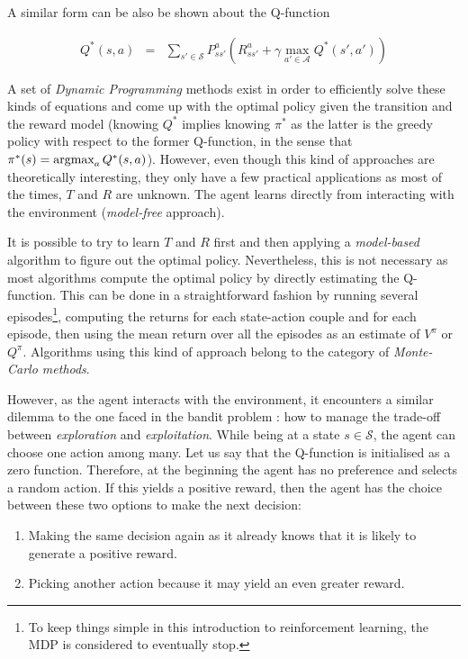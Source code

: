         A similar form can be also be shown about the Q-function
								
					\begin{eqnarray}
						Q^*(s,a) & = & \sum_{s' \in \mathcal{S}} P_{ss'}^a (R_{ss'}^a + \gamma \max_{a' \in \mathcal{A}} Q^*(s',a')) \label{eq:qbellmanoptim}
					\end{eqnarray}

        A set of \textit{Dynamic Programming} methods exist in order to efficiently solve these kinds of equations and come up with the optimal policy given the transition and the reward model (knowing $Q^*$ implies knowing $\pi^*$ as the latter is the greedy policy with respect to the former Q-function, in the sense that $\pi^*(s) = \mathop{\hbox{argmax}}_a Q^*(s,a)$). However, even though this kind of approaches are theoretically interesting, they only have a few practical applications as most of the times, $T$ and $R$ are unknown. The agent learns directly from interacting with the environment (\textit{model-free} approach).
				
				It is possible to try to learn $T$ and $R$ first and then applying a \textit{model-based} algorithm to figure out the optimal policy. Nevertheless, this is not necessary as most algorithms compute the optimal policy by directly estimating the Q-function. This can be done in a straightforward fashion by running several episodes\footnote{To keep things simple in this introduction to reinforcement learning, the MDP is considered to eventually stop.}, computing the returns for each state-action couple and for each episode, then using the mean return over all the episodes as an estimate of $V^\pi$ or $Q^\pi$. Algorithms using this kind of approach belong to the category of \textit{Monte-Carlo methods}.
				
				However, as the agent interacts with the environment, it encounters a similar dilemma to the one faced in the bandit problem \cite{Berry1985}: how to manage the trade-off between \textit{exploration} and \textit{exploitation}. While being at a state $s \in \mathcal{S}$, the agent can choose one action among many. Let us say that the Q-function is initialised as a zero function. Therefore, at the beginning the agent has no preference and selects a random action. If this yields a positive reward, then the agent has the choice between these two options to make the next decision:
				
				\begin{enumerate}
					\item Making the same decision again as it already knows that it is likely to generate a positive reward.
					\item Picking another action because it may yield an even greater reward.
				\end{enumerate}
				
